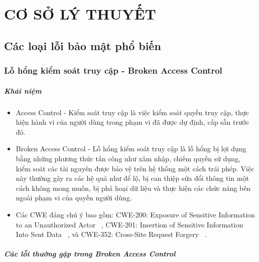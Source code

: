 \chapter{CƠ SỞ LÝ THUYẾT}

\section{Các loại lỗi bảo mật phổ biến}

\subsection{Lỗ hổng kiểm soát truy cập - Broken Access Control ~\cite{chap2bib1}}
 
\paragraph{Khái niệm}

\begin{itemize}
    \item Access Control - Kiểm soát truy cập là việc kiểm soát quyền truy cập, thực hiện hành vi của người dùng trong phạm vi đã được dự định, cấp sẵn trước đó.
    \item Broken Access Control - Lỗ hổng kiểm soát truy cập là lỗ hổng bị lợi dụng bằng những phương thức tấn công như xâm nhập, chiếm quyền sử dụng, kiểm soát các tài nguyên được bảo vệ trên hệ thống một cách trái phép. Việc này thường gây ra các hệ quả như để lộ, bị can thiệp sửa đổi thông tin một cách không mong muốn, bị phá hoại dữ liệu và thực hiện các chức năng bên ngoài phạm vi của quyền người dùng.
    \item Các CWE đáng chú ý bao gồm: CWE-200: Exposure of Sensitive Information to an Unauthorized Actor ~\cite{chap2bib4}, CWE-201: Insertion of Sensitive Information Into Sent Data ~\cite{chap2bib5}, và CWE-352: Cross-Site Request Forgery ~\cite{chap2bib6}.
\end{itemize}

\paragraph{Các lỗi thường gặp trong Broken Access Control}


